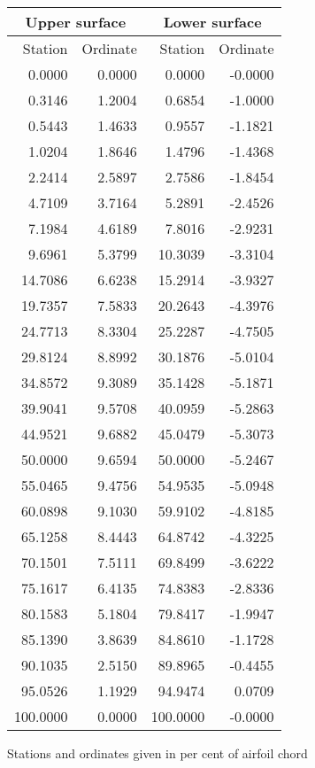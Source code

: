 \documentclass[11pt]{book}
\begin{document}
 \hspace{4mm}
 \begin{tabular}{|r|r|r|r|} \hline 
 \multicolumn{2}{|c|}{Upper surface} & \multicolumn{2}{|c|}{Lower surface} \\
 \hline
 Station & Ordinate & Station & Ordinate \\
 \hline
0.0000 & 0.0000 & 0.0000 & -0.0000 \\
0.3146 & 1.2004 & 0.6854 & -1.0000 \\
0.5443 & 1.4633 & 0.9557 & -1.1821 \\
1.0204 & 1.8646 & 1.4796 & -1.4368 \\
2.2414 & 2.5897 & 2.7586 & -1.8454 \\
4.7109 & 3.7164 & 5.2891 & -2.4526 \\
7.1984 & 4.6189 & 7.8016 & -2.9231 \\
9.6961 & 5.3799 & 10.3039 & -3.3104 \\
14.7086 & 6.6238 & 15.2914 & -3.9327 \\
19.7357 & 7.5833 & 20.2643 & -4.3976 \\
24.7713 & 8.3304 & 25.2287 & -4.7505 \\
29.8124 & 8.8992 & 30.1876 & -5.0104 \\
34.8572 & 9.3089 & 35.1428 & -5.1871 \\
39.9041 & 9.5708 & 40.0959 & -5.2863 \\
44.9521 & 9.6882 & 45.0479 & -5.3073 \\
50.0000 & 9.6594 & 50.0000 & -5.2467 \\
55.0465 & 9.4756 & 54.9535 & -5.0948 \\
60.0898 & 9.1030 & 59.9102 & -4.8185 \\
65.1258 & 8.4443 & 64.8742 & -4.3225 \\
70.1501 & 7.5111 & 69.8499 & -3.6222 \\
75.1617 & 6.4135 & 74.8383 & -2.8336 \\
80.1583 & 5.1804 & 79.8417 & -1.9947 \\
85.1390 & 3.8639 & 84.8610 & -1.1728 \\
90.1035 & 2.5150 & 89.8965 & -0.4455 \\
95.0526 & 1.1929 & 94.9474 & 0.0709 \\
100.0000 & 0.0000 & 100.0000 & -0.0000 \\
 \hline 
 \end{tabular}
 \vspace{8mm}

Stations and ordinates given in per cent of airfoil chord
\end{document}
